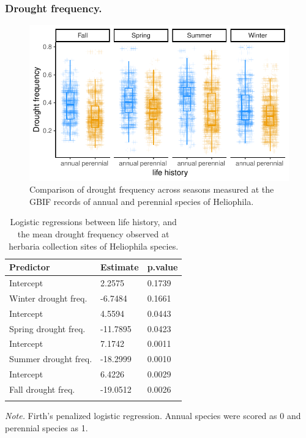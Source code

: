 \documentclass[man,floatsintext]{apa6}
\theoremstyle{definition}
\theoremstyle{definition}
\theoremstyle{definition}
\theoremstyle{remark}
\begin{document}
\hypertarget{drought-frequency.}{%
\subsubsection{Drought frequency.}\label{drought-frequency.}}




\begin{figure}
\centering
\includegraphics{../figures/life_history_drought_boxplots.pdf}
\caption{\label{fig:boxplots}Comparison of drought frequency across seasons measured
at the GBIF records of annual and perennial species of Heliophila.}
\end{figure}

\begin{table}[tbp]
\begin{center}
\begin{threeparttable}
\caption{\label{tab:firthmodelstable}Logistic regressions between life history, and the mean drought frequency observed at herbaria collection sites of Heliophila species. }
\begin{tabular}{lll}
\toprule
Predictor & \multicolumn{1}{c}{Estimate} & \multicolumn{1}{c}{p.value}\\
\midrule
Intercept & 2.2575 & 0.1739\\
Winter drought freq. & -6.7484 & 0.1661\\ \midrule
Intercept & 4.5594 & 0.0443\\
Spring drought freq. & -11.7895 & 0.0423\\ \midrule
Intercept & 7.1742 & 0.0011\\
Summer drought freq. & -18.2999 & 0.0010\\ \midrule
Intercept & 6.4226 & 0.0029\\
Fall drought freq. & -19.0512 & 0.0026\\ \midrule
\bottomrule
\addlinespace
\end{tabular}
\begin{tablenotes}[para]
\normalsize{\textit{Note.} Firth's penalized logistic regression. Annual species were scored as 0 and perennial species as 1.}
\end{tablenotes}
\end{threeparttable}
\end{center}
\end{table}
\end{document}
